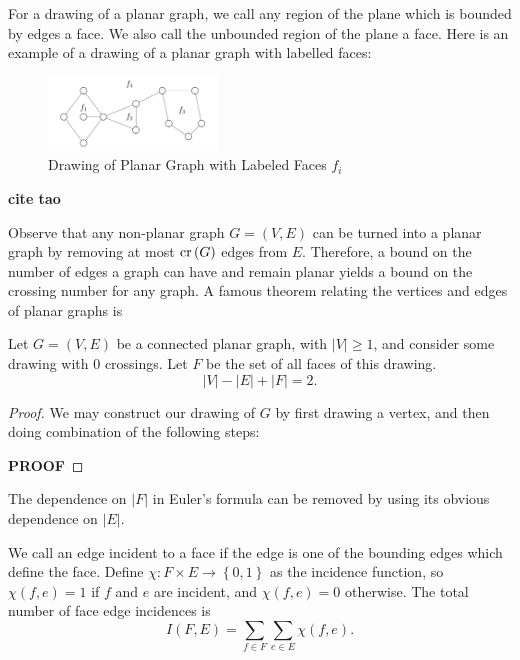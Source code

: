 \documentclass[12pt]{amsart}
\begin{document}
For a drawing of a planar graph, we call any region of the plane which is bounded by edges a face. We also call
the unbounded region of the plane a face. Here is an example of a drawing of a planar
graph with labelled faces:

\begin{figure}[h]
    \centering
    \includegraphics[width=0.4\textwidth]{faceimage.png}
    \caption{Drawing of Planar Graph with Labeled Faces \(f_{i} \)}
\end{figure}

\textbf{cite tao }

Observe that any non-planar graph \(G = (V,E)\) can be turned into a planar graph by removing at most
\(\operatorname{cr}\left( G \right) \) edges from \(E\). Therefore, a bound on the number of
edges a graph can have and remain planar yields a bound on the crossing number for any graph.
A famous theorem relating the vertices and edges of planar graphs is

\begin{theorem}\label{thm:euler-formula-graphs}
Let \(G = (V,E)\) be a connected planar graph, with \(\left\lvert V \right\rvert \geq 1\), and consider some drawing with 0 crossings.
Let \(F\) be the set of all faces of this drawing.
\[
    \left\lvert V \right\rvert - \left\lvert E \right\rvert + \left\lvert F \right\rvert = 2
.\]
\end{theorem}

\begin{proof}
We may construct our drawing of \(G\) by first drawing a vertex, and then doing combination of the following steps: 

\textbf{PROOF}
\end{proof}

The dependence on \(\left\lvert F \right\rvert \) in Euler's formula can be removed by using
its obvious dependence on \(\left\lvert E \right\rvert \). 

We call an edge incident to a face if the edge is one of the bounding edges which define the face. 
Define \(\chi : F \times E \to \left\{ 0,1 \right\} \) as the incidence function, so
\(\chi(f,e) = 1\) if \(f\) and \(e\) are incident, and \(\chi(f,e) = 0\) otherwise.
The total number of face edge incidences is
\[
    I(F,E) = \sum_{f\in F} \sum _{e \in E} \chi(f,e)
.\]
\end{document}
